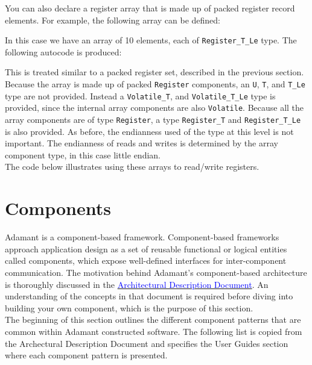 You can also declare a register array that is made up of packed register record elements. For example, the following array can be defined:


In this case we have an array of 10 elements, each of \texttt{Register\_T\_Le} type. The following autocode is produced:


This is treated similar to a packed register set, described in the previous section. Because the array is made up of packed \texttt{Register} components, an \texttt{U}, \texttt{T}, and \texttt{T\_Le} type are not provided. Instead a \texttt{Volatile\_T}, and \texttt{Volatile\_T\_Le} type is provided, since the internal array components are also \texttt{Volatile}. Because all the array components are of type \texttt{Register}, a type \texttt{Register\_T} and \texttt{Register\_T\_Le} is also provided. As before, the endianness used of the type at this level is not important. The endianness of reads and writes is determined by the array component type, in this case little endian. \\

The code below illustrates using these arrays to read/write registers.


\newpage
\section{Components} \label{Components}

Adamant is a component-based framework. Component-based frameworks approach application design as a set of reusable functional or logical entities called components, which expose well-defined interfaces for inter-component communication. The motivation behind Adamant's component-based architecture is thoroughly discussed in the \href{https://github.com/lasp/adamant/blob/main/doc/architecture_description_document/architecture_description_document.pdf}{\textcolor{blue}{Architectural Description Document}}. An understanding of the concepts in that document is required before diving into building your own component, which is the purpose of this section. \\

The beginning of this section outlines the different component patterns that are common within Adamant constructed software. The following list is copied from the Archectural Description Document and specifies the User Guides section where each component pattern is presented.

